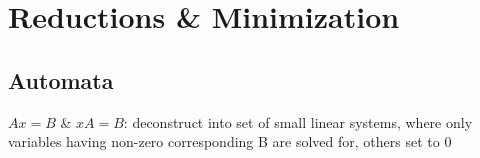 \chapter{Reductions \& Minimization}

\section{Automata}
$Ax = B$ \& $xA = B$: deconstruct into set of small linear systems, where only variables having non-zero corresponding B are solved for, others set to 0
